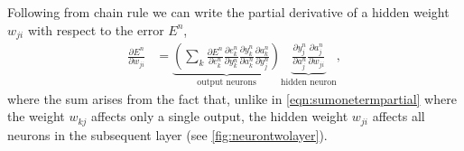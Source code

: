 \documentclass[thesis]{subfiles}
\begin{document}
Following from chain rule we can write the partial derivative of a hidden weight $w_{ji}$ with respect to the error $E^n$,
\begin{equation}
\begin{aligned}
    \frac{\partial E^n}{\partial w_{ji}} &= \underbrace{\left( \sum_k \frac{\partial E^n}{\partial e^n_{k}}
     \frac{\partial e^n_{k}}{\partial y^n_{k}} \frac{\partial y^n_{k}}{\partial a^n_k} \frac{\partial a^n_k}{\partial y^n_{j}}\right)}_\text{output neurons}
     \underbrace{\frac{\partial y^n_{j}}{\partial a^n_{j}} \frac{\partial a^n_{j}}{\partial w_{ji}}}_\text{hidden neuron},
     \label{eqn:twolayer1}
\end{aligned}
\end{equation}
%
where the sum arises from the fact that, unlike in \cref{eqn:sumonetermpartial} where the weight $w_{kj}$ affects only a single output, the hidden weight $w_{ji}$ affects all neurons in the subsequent layer (see \cref{fig:neurontwolayer}).
\end{document}
